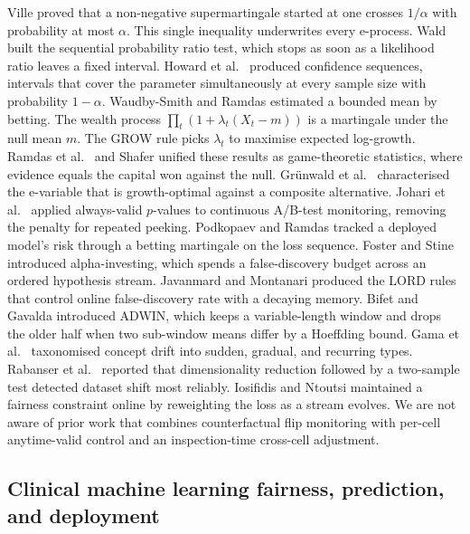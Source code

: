 \documentclass[acmsmall,nonacm,review,anonymous]{acmart}
\newcommand{\1}[1]{\mathbf{1}\!\left\{#1\right\}}
\begin{document}
Ville \cite{ville1939} proved that a non-negative supermartingale started at one crosses $1/\alpha$ with probability at most $\alpha$. This single inequality underwrites every e-process. Wald \cite{wald1947} built the sequential probability ratio test, which stops as soon as a likelihood ratio leaves a fixed interval. Howard et al.\ \cite{howard2021} produced confidence sequences, intervals that cover the parameter simultaneously at every sample size with probability $1-\alpha$. Waudby-Smith and Ramdas \cite{waudbysmith2024} estimated a bounded mean by betting. The wealth process $\prod_t (1 + \lambda_t (X_t - m))$ is a martingale under the null mean $m$. The GROW rule picks $\lambda_t$ to maximise expected log-growth. Ramdas et al.\ \cite{ramdas2023} and Shafer \cite{shafer2021testing} unified these results as game-theoretic statistics, where evidence equals the capital won against the null. Gr{\"u}nwald et al.\ \cite{grunwald2024} characterised the e-variable that is growth-optimal against a composite alternative. Johari et al.\ \cite{johari2022} applied always-valid $p$-values to continuous A/B-test monitoring, removing the penalty for repeated peeking. Podkopaev and Ramdas \cite{podkopaev2023} tracked a deployed model's risk through a betting martingale on the loss sequence. Foster and Stine \cite{foster2008} introduced alpha-investing, which spends a false-discovery budget across an ordered hypothesis stream. Javanmard and Montanari \cite{javanmard2018} produced the LORD rules that control online false-discovery rate with a decaying memory. Bifet and Gavalda \cite{bifet2007} introduced ADWIN, which keeps a variable-length window and drops the older half when two sub-window means differ by a Hoeffding bound. Gama et al.\ \cite{gama2014survey} taxonomised concept drift into sudden, gradual, and recurring types. Rabanser et al.\ \cite{rabanser2019failing} reported that dimensionality reduction followed by a two-sample test detected dataset shift most reliably. Iosifidis and Ntoutsi \cite{iosifidis2019, iosifidis2020} maintained a fairness constraint online by reweighting the loss as a stream evolves. We are not aware of prior work that combines counterfactual flip monitoring with per-cell anytime-valid control and an inspection-time cross-cell adjustment.

\subsection{Clinical machine learning fairness, prediction, and deployment}
\end{document}
